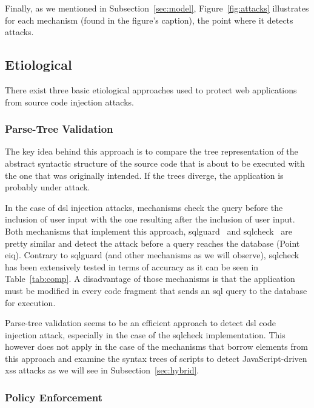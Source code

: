 \documentclass[conference]{IEEEtran}
\begin{document}
Finally, as we mentioned in Subsection~\ref{sec:model},
Figure~\ref{fig:attacks} illustrates for each mechanism (found in the
figure's caption), the point where it detects attacks.

\subsection{Etiological}
\label{sec:prot}

There exist three basic etiological approaches used to protect web
applications from source code injection attacks.

\subsubsection{Parse-Tree Validation}
\label{sec:tree}

The key idea behind this approach is to compare
the tree representation of the abstract syntactic
structure of the source code that is about to be
executed with the one that was originally intended.
If the trees diverge, the application is probably
under attack.

In the case of {\sc dsl} injection attacks, mechanisms check 
the query before the inclusion of user input with the one
resulting after the inclusion of user input.
Both mechanisms that implement this approach,
{\sc sqlg}uard~\cite{BWS05} and
{\sc sql}check~\cite{SW06} are pretty similar
and detect the attack before a query reaches the
database (Point {\sc e}i{\sc q}).
Contrary to {\sc sqlg}uard (and other
mechanisms as we will observe), {\sc sql}check has been
extensively tested in terms of accuracy
as it can be seen in Table~\ref{tab:comp}.
A disadvantage of those mechanisms is that the
application must be modified in every code fragment
that sends an {\sc sql} query to the database for execution.

Parse-tree validation seems to be an efficient approach
to detect {\sc dsl} code injection attack,
especially in the case of the {\sc sql}check
implementation. This however does not apply in
the case of the mechanisms that borrow elements from
this approach and examine the syntax trees
of scripts to detect JavaScript-driven {\sc xss} attacks
as we will see in Subsection~\ref{sec:hybrid}.

\subsubsection{Policy Enforcement}
\label{sec:policy}
\end{document}
